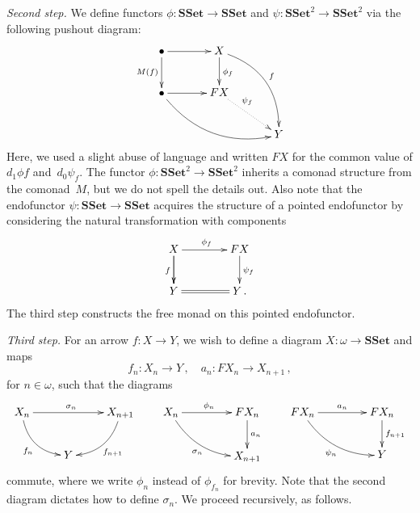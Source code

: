 \documentclass[reqno,10pt,a4paper,oneside]{amsart}
\theoremstyle{definition}
\newcommand{\co}{\colon}
\newcommand{\SSet}{\mathbf{SSet}}
\begin{document}
 \noindent
 {\itshape Second step.} We define functors $\phi \co
 \SSet \to \SSet$ and $\psi \co \SSet^2 \to \SSet^2$    via the following pushout diagram:
\[
   \xymatrix@C=1.2cm{
 \bullet \ar[r] \ar[d]_{M(f)} & X \ar[d]^{\phi_f} \ar@/^1.5pc/[ddr]^{f} \\
  \bullet \ar[r] \ar@/_1.5pc/[drr]  & FX \ar@{.>}[dr]^-(.3){\psi_f}  \\ 
   & & Y  }
 \]
Here, we used a slight abuse of language and written $FX$ for the common value of $d_1 \phi f$ 
and~$d_0 \psi_f$.
The functor $\phi \co  \SSet^2 \to \SSet^2$ inherits a comonad structure from the 
 comonad~$M$, but we do not spell  the details out.  Also note that the endofunctor
 $\psi \co \SSet  \to \SSet$ acquires the structure of a pointed endofunctor by considering the natural
 transformation with components
 \[
 \xymatrix@C=1.4cm{
 X \ar[d]_f \ar[r]^{\phi_f} \ar[d] & FX \ar[d]^{\psi_f} \\
 Y \ar@{=}[r]  & Y \, .}
 \]
 The third step constructs the free monad on this pointed endofunctor. 
 
 \medskip

\noindent 
 {\itshape Third step.}  For an arrow $f \co X \rightarrow Y$, we wish to define a diagram $X \co  \omega \to \SSet$
 and  maps 
 \[
 f_n \co X_n \to Y \, , \quad a_{n} \co FX_n \to X_{n+1} \, ,
 \] 
 for $n \in \omega$, such that the diagrams
 \[
 \xymatrix{
  X_n   \ar@/_1pc/[dr]_-{f_n}  \ar[rr]^{\sigma_n} &   & X_{n+1} \ar@/^1pc/[dl]^-{f_{n+1}}   \\
   &  Y &  } \qquad  
  \xymatrix@C=1.5cm{
  X_n \ar[r]^{\phi_n}  \ar@/_1pc/[dr]_{\sigma_n} & FX_n \ar[d]^{a_{n}} \\ 
   & X_{n+1} } \qquad 
  \xymatrix@C=1.5cm{
  FX_n \ar[r]^{a_n}  \ar@/_1pc/[dr]_{\psi_n} & FX_n \ar[d]^{f_{n+1}} \\ 
   & Y}    
   \]
   commute, where we write $\phi_n$ instead of $\phi_{f_n}$ for brevity.
Note that the second diagram dictates how to define $\sigma_n$. We proceed recursively, as follows.
 
\end{document}
